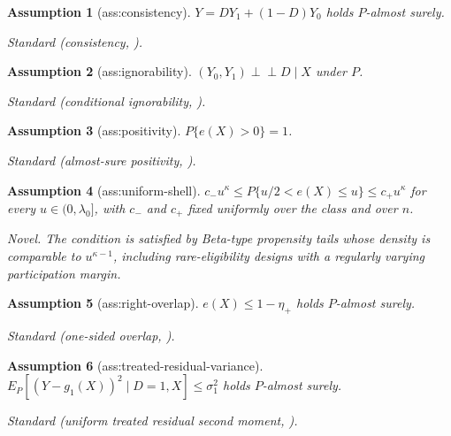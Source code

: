 \documentclass{article}
\newtheorem{assumption}{Assumption}
\begin{document}
\begin{assumption}[ass:consistency]\label{ass:consistency}
\(Y=D Y_1+(1-D)Y_0\) holds \(P\)-almost surely.
\par\smallskip\noindent\emph{Standard} (consistency, \cite{HiranoImbensRidder2003EfficientATE}).
\end{assumption}

\begin{assumption}[ass:ignorability]\label{ass:ignorability}
\((Y_0,Y_1)\mathrel{\perp\!\!\!\perp}D\mid X\) under \(P\).
\par\smallskip\noindent\emph{Standard} (conditional ignorability, \cite{HiranoImbensRidder2003EfficientATE}).
\end{assumption}

\begin{assumption}[ass:positivity]\label{ass:positivity}
\(P\{e(X)>0\}=1\).
\par\smallskip\noindent\emph{Standard} (almost-sure positivity, \cite{KhanTamer2010Irregular}).
\end{assumption}

\begin{assumption}[ass:uniform-shell]\label{ass:uniform-shell}
\(c_-u^{\kappa}\le P\{u/2<e(X)\le u\}\le c_+u^{\kappa}\) for every \(u\in(0,\lambda_0]\), with \(c_-\) and \(c_+\) fixed uniformly over the class and over \(n\).
\par\smallskip\noindent\emph{Novel.} The condition is satisfied by Beta-type propensity tails whose density is comparable to \(u^{\kappa-1}\), including rare-eligibility designs with a regularly varying participation margin.
\end{assumption}

\begin{assumption}[ass:right-overlap]\label{ass:right-overlap}
\(e(X)\le 1-\eta_+\) holds \(P\)-almost surely.
\par\smallskip\noindent\emph{Standard} (one-sided overlap, \cite{Dorn2025WeakOverlapTStatistics}).
\end{assumption}

\begin{assumption}[ass:treated-residual-variance]\label{ass:treated-residual-variance}
\(E_P[(Y-g_1(X))^2\mid D=1,X]\le\sigma_1^2\) holds \(P\)-almost surely.
\par\smallskip\noindent\emph{Standard} (uniform treated residual second moment, \cite{Dorn2025WeakOverlapTStatistics}).
\end{assumption}
\end{document}
